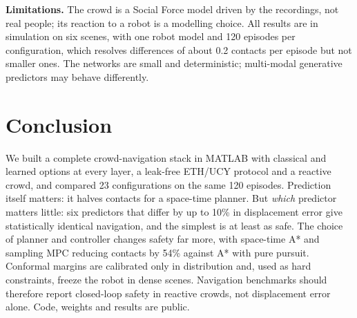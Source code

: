 \textbf{Limitations.} The crowd is a Social Force model driven by the
recordings, not real people; its reaction to a robot is a modelling
choice. All results are in simulation on six scenes, with one robot
model and 120 episodes per configuration, which resolves differences of
about 0.2 contacts per episode but not smaller ones. The networks are
small and deterministic; multi-modal generative predictors
\cite{gupta2018,salzmann2020} may behave differently.

\section{Conclusion}
We built a complete crowd-navigation stack in MATLAB with classical and
learned options at every layer, a leak-free ETH/UCY protocol and a
reactive crowd, and compared 23 configurations on the same 120 episodes.
Prediction itself matters: it halves contacts for a space-time planner.
But \emph{which} predictor matters little: six predictors that differ by
up to 10\% in displacement error give statistically identical navigation,
and the simplest is at least as safe. The choice of planner and controller
changes safety far more, with space-time A* and sampling MPC reducing
contacts by 54\% against A* with pure pursuit. Conformal margins are
calibrated only in distribution and, used as hard constraints, freeze the
robot in dense scenes. Navigation benchmarks should therefore report
closed-loop safety in reactive crowds, not displacement error alone.
Code, weights and results are public.
